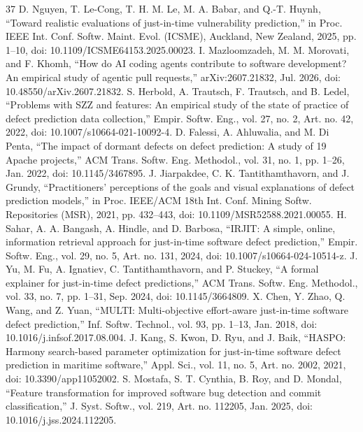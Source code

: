 \begin{thebibliography}{37}
 D. Nguyen, T. Le-Cong, T. H. M. Le, M. A. Babar, and Q.-T. Huynh, ``Toward realistic evaluations of just-in-time vulnerability prediction,'' in Proc. IEEE Int. Conf. Softw. Maint. Evol. (ICSME), Auckland, New Zealand, 2025, pp. 1--10, doi: \mbox{10.1109/ICSME64153.2025.00023}.
 I. Mazloomzadeh, M. M. Morovati, and F. Khomh, ``How do AI coding agents contribute to software development? An empirical study of agentic pull requests,'' arXiv:2607.21832, Jul. 2026, doi: \mbox{10.48550/arXiv.2607.21832}.
 S. Herbold, A. Trautsch, F. Trautsch, and B. Ledel, ``Problems with SZZ and features: An empirical study of the state of practice of defect prediction data collection,'' Empir. Softw. Eng., vol. 27, no. 2, Art. no. 42, 2022, doi: \mbox{10.1007/s10664-021-10092-4}.
 D. Falessi, A. Ahluwalia, and M. Di Penta, ``The impact of dormant defects on defect prediction: A study of 19 Apache projects,'' ACM Trans. Softw. Eng. Methodol., vol. 31, no. 1, pp. 1--26, Jan. 2022, doi: \mbox{10.1145/3467895}.
 J. Jiarpakdee, C. K. Tantithamthavorn, and J. Grundy, ``Practitioners' perceptions of the goals and visual explanations of defect prediction models,'' in Proc. IEEE/ACM 18th Int. Conf. Mining Softw. Repositories (MSR), 2021, pp. 432--443, doi: \mbox{10.1109/MSR52588.2021.00055}.
 H. Sahar, A. A. Bangash, A. Hindle, and D. Barbosa, ``IRJIT: A simple, online, information retrieval approach for just-in-time software defect prediction,'' Empir. Softw. Eng., vol. 29, no. 5, Art. no. 131, 2024, doi: \mbox{10.1007/s10664-024-10514-z}.
 J. Yu, M. Fu, A. Ignatiev, C. Tantithamthavorn, and P. Stuckey, ``A formal explainer for just-in-time defect predictions,'' ACM Trans. Softw. Eng. Methodol., vol. 33, no. 7, pp. 1--31, Sep. 2024, doi: \mbox{10.1145/3664809}.
 X. Chen, Y. Zhao, Q. Wang, and Z. Yuan, ``MULTI: Multi-objective effort-aware just-in-time software defect prediction,'' Inf. Softw. Technol., vol. 93, pp. 1--13, Jan. 2018, doi: \mbox{10.1016/j.infsof.2017.08.004}.
 J. Kang, S. Kwon, D. Ryu, and J. Baik, ``HASPO: Harmony search-based parameter optimization for just-in-time software defect prediction in maritime software,'' Appl. Sci., vol. 11, no. 5, Art. no. 2002, 2021, doi: \mbox{10.3390/app11052002}.
 S. Mostafa, S. T. Cynthia, B. Roy, and D. Mondal, ``Feature transformation for improved software bug detection and commit classification,'' J. Syst. Softw., vol. 219, Art. no. 112205, Jan. 2025, doi: \mbox{10.1016/j.jss.2024.112205}.

\end{thebibliography}
